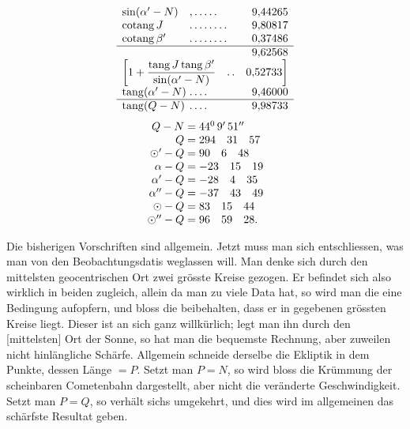\[
\begin{array}{l@{\;}l@{\;}r}
\sin(\alpha'-N)&\mathord{,}\,\mathord{.}\,\mathord{.}\,\mathord{.}\,\mathord{.}\,\mathord{.}&9{,}44265\\
\operatorname{cotang}J&\mathord{.}\,\mathord{.}\,\mathord{.}\,\mathord{.}\,\mathord{.}\,\mathord{.}\,\mathord{.}\,\mathord{.}&9{,}80817\\
\operatorname{cotang}\beta'&\mathord{.}\,\mathord{.}\,\mathord{.}\,\mathord{.}\,\mathord{.}\,\mathord{.}\,\mathord{.}\,\mathord{.}&0{,}37486\\\hline
&&9{,}62568\\
\multicolumn{3}{l}{\left[1+\dfrac{\operatorname{tang}J\operatorname{tang}\beta'}{\sin(\alpha'-N)}\quad\mathord{.}\,\mathord{.}\quad0{,}52733\right]}\\
\operatorname{tang}(\alpha'-N)&\mathord{.}\,\mathord{.}\,\mathord{.}\,\mathord{.}&9{,}46000\\\hline
\operatorname{tang}(Q-N)&\mathord{.}\,\mathord{.}\,\mathord{.}\,\mathord{.}&9{,}98733
\end{array}
\]
\[
\begin{array}{r@{\;}l}
Q-N=&44^{0}\,9'\,51''\\
Q=&294\quad31\quad57\\
\odot'-Q=&90\quad6\quad48\\
\alpha-Q=&-23\quad15\quad19\\
\alpha'-Q=&-28\quad4\quad35\\
\alpha''-Q=&-37\quad43\quad49\\
\odot-Q=&83\quad15\quad44\\
\odot''-Q=&96\quad59\quad28.
\end{array}
\]

Die bisherigen Vorschriften sind allgemein. Jetzt muss man sich entschliessen, was man von den Beobachtungsdatis weglassen will. Man denke sich durch den mittelsten geocentrischen Ort zwei grösste Kreise gezogen. Er befindet sich also wirklich in beiden zugleich, allein da man zu viele Data hat, so wird man die eine Bedingung aufopfern, und bloss die beibehalten, dass er in  gegebenen grössten Kreise liegt. Dieser ist an sich ganz willkürlich; legt man ihn durch den [mittelsten] Ort der Sonne, so hat man die bequemste Rechnung, aber zuweilen nicht hinlängliche Schärfe. Allgemein schneide derselbe die Ekliptik in dem Punkte, dessen Länge \(=P\). Setzt man \(P=N\), so wird bloss die Krümmung der scheinbaren Cometenbahn dargestellt, aber nicht die veränderte Geschwindigkeit. Setzt man \(P=Q\), so verhält sichs umgekehrt, und dies wird im allgemeinen das schärfste Resultat geben.

